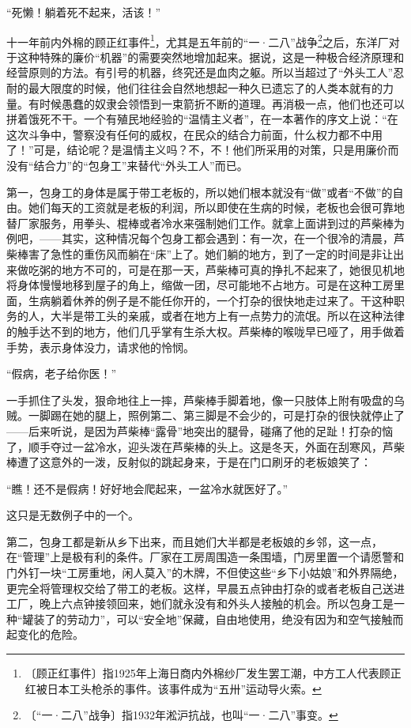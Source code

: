 \documentclass[12pt,UTF-8,openany]{ctexbook}
\begin{document}
\begin{large}
    “死懒！躺着死不起来，活该！”
    
    十一年前内外棉的顾正红事件\footnote{〔顾正红事件〕指1925年上海日商内外棉纱厂发生罢工潮，中方工人代表顾正红被日本工头枪杀的事件。该事件成为“五卅”运动导火索。}，尤其是五年前的“一·二八”战争\footnote{〔“一·二八”战争〕指1932年淞沪抗战，也叫“一·二八”事变。}之后，东洋厂对于这种特殊的廉价“机器”的需要突然地增加起来。据说，这是一种极合经济原理和经营原则的方法。有引号的机器，终究还是血肉之躯。所以当超过了“外头工人”忍耐的最大限度的时候，他们往往会自然地想起一种久已遗忘了的人类本就有的力量。有时候愚蠢的奴隶会领悟到一束箭折不断的道理。再消极一点，他们也还可以拼着饿死不干。一个有殖民地经验的“温情主义者”，在一本著作的序文上说：“在这次斗争中，警察没有任何的威权，在民众的结合力前面，什么权力都不中用了！”可是，结论呢？是温情主义吗？不，不！他们所采用的对策，只是用廉价而没有“结合力”的“包身工”来替代“外头工人”而已。
    
    第一，包身工的身体是属于带工老板的，所以她们根本就没有“做”或者“不做”的自由。她们每天的工资就是老板的利润，所以即使在生病的时候，老板也会很可靠地替厂家服务，用拳头、棍棒或者冷水来强制她们工作。就拿上面讲到过的芦柴棒为例吧，——其实，这种情况每个包身工都会遇到：有一次，在一个很冷的清晨，芦柴棒害了急性的重伤风而躺在“床”上了。她们躺的地方，到了一定的时间是非让出来做吃粥的地方不可的，可是在那一天，芦柴棒可真的挣扎不起来了，她很见机地将身体慢慢地移到屋子的角上，缩做一团，尽可能地不占地方。可是在这种工房里面，生病躺着休养的例子是不能任你开的，一个打杂的很快地走过来了。干这种职务的人，大半是带工头的亲戚，或者在地方上有一点势力的流氓。所以在这种法律的触手达不到的地方，他们几乎掌有生杀大权。芦柴棒的喉咙早已哑了，用手做着手势，表示身体没力，请求他的怜悯。
    
    “假病，老子给你医！”
    
    一手抓住了头发，狠命地往上一摔，芦柴棒手脚着地，像一只肢体上附有吸盘的乌贼。一脚踢在她的腿上，照例第二、第三脚是不会少的，可是打杂的很快就停止了——后来听说，是因为芦柴棒“露骨”地突出的腿骨，碰痛了他的足趾！打杂的恼了，顺手夺过一盆冷水，迎头泼在芦柴棒的头上。这是冬天，外面在刮寒风，芦柴棒遭了这意外的一泼，反射似的跳起身来，于是在门口刷牙的老板娘笑了：
    
    “瞧！还不是假病！好好地会爬起来，一盆冷水就医好了。”
    
    这只是无数例子中的一个。
    
    第二，包身工都是新从乡下出来，而且她们大半都是老板娘的乡邻，这一点，在“管理”上是极有利的条件。厂家在工房周围造一条围墙，门房里置一个请愿警和门外钉一块“工房重地，闲人莫入”的木牌，不但使这些“乡下小姑娘”和外界隔绝，更完全将管理权交给了带工的老板。这样，早晨五点钟由打杂的或者老板自己送进工厂，晚上六点钟接领回来，她们就永没有和外头人接触的机会。所以包身工是一种“罐装了的劳动力”，可以“安全地”保藏，自由地使用，绝没有因为和空气接触而起变化的危险。
    

\end{large}
\end{document}
